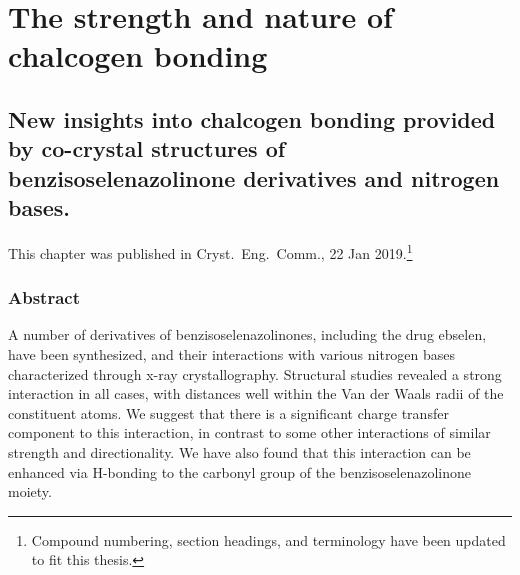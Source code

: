 \part{The strength and nature of chalcogen bonding}

\begin{refsection}

\chapter[Insights from co-crystal structures]{New insights into chalcogen bonding provided by co-crystal structures of benzisoselenazolinone derivatives and nitrogen bases.}\label{sec:crystengcomm1}

This chapter was published in Cryst.\ Eng.\ Comm., 22 Jan 2019\autocite{Fellowes2019}.\footnote{Compound numbering, section headings, and terminology have been updated to fit this thesis.}

\section{Abstract}
A number of derivatives of benzisoselenazolinones, including the drug ebselen, have been synthesized, and their interactions with various nitrogen bases characterized through x-ray crystallography.
Structural studies revealed a strong interaction in all cases, with  distances well within the Van der Waals radii of the constituent atoms.
We suggest that there is a significant charge transfer component to this interaction, in contrast to some other interactions of similar strength and directionality.
We have also found that this interaction can be enhanced via H-bonding to the carbonyl group of the benzisoselenazolinone moiety.



\end{refsection}
